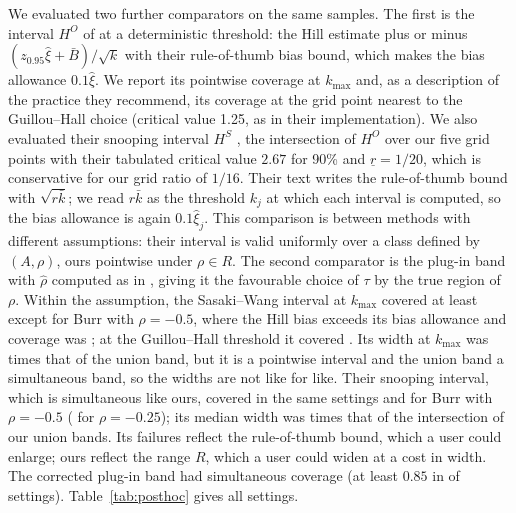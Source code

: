 \documentclass[11pt]{article}
\theoremstyle{definition}
\theoremstyle{remark}
\numberwithin{equation}{section}
\begin{document}
We evaluated two further comparators on the same samples. The first is the interval $H^O$ of \citet[eq.~11]{sasakiwang2024} at a deterministic threshold: the Hill estimate plus or minus $(z_{0.95}\hat\xi+\bar B)/\sqrt{k}$ with their rule-of-thumb bias bound, which makes the bias allowance $0.1\hat\xi$. We report its pointwise coverage at $k_{\max}$ and, as a description of the practice they recommend, its coverage at the grid point nearest to the Guillou--Hall choice (critical value 1.25, as in their implementation). We also evaluated their snooping interval $H^S$ \citep[eq.~15]{sasakiwang2024}, the intersection of $H^O$ over our five grid points with their tabulated critical value $2.67$ for 90\% and $\underline r=1/20$, which is conservative for our grid ratio of $1/16$. Their text writes the rule-of-thumb bound with $\sqrt{r\bar k}$; we read $r\bar k$ as the threshold $k_j$ at which each interval is computed, so the bias allowance is again $0.1\hat\xi_j$. This comparison is between methods with different assumptions: their interval is valid uniformly over a class defined by $(A,\rho)$, ours pointwise under $\rho\in R$. The second comparator is the plug-in band with $\hat\rho$ computed as in \citet{cgp2005}, giving it the favourable choice of $\tau$ by the true region of $\rho$. Within the assumption, the Sasaki--Wang interval at $k_{\max}$ covered at least \swTopGoodMin{} except for Burr with $\rho=-0.5$, where the Hill bias exceeds its bias allowance and coverage was \swTopBurr; at the Guillou--Hall threshold it covered \swGHIn. Its width at $k_{\max}$ was \swWidthRatio{} times that of the union band, but it is a pointwise interval and the union band a simultaneous band, so the widths are not like for like. Their snooping interval, which is simultaneous like ours, covered \swSnoopGood{} in the same settings and \swSnoopBurr{} for Burr with $\rho=-0.5$ (\swSnoopOut{} for $\rho=-0.25$); its median width was \swSnoopWidthRatio{} times that of the intersection of our union bands. Its failures reflect the rule-of-thumb bound, which a user could enlarge; ours reflect the range $R$, which a user could widen at a cost in width. The corrected plug-in band had simultaneous coverage \cgpSimIn{} (at least $0.85$ in \cgpSimInN{} of \nCellsIn{} settings). Table~\ref{tab:posthoc} gives all settings.

\begin{table}[t]
\centering\small
\caption{Post hoc comparators on the confirmatory samples: Sasaki--Wang interval $H^O$ with their rule-of-thumb bias bound (pointwise coverage at $k_{\max}$, coverage at the Guillou--Hall threshold, mean width at $k_{\max}$), plug-in band with the $\hat\rho$ of \citet{cgp2005}, and the union band. Widths are of the band at $k_{\max}$. $^\dagger$ outside $R$.}
\label{tab:posthoc}
\setlength{\tabcolsep}{3.5pt}\footnotesize

\end{table}
\end{document}
